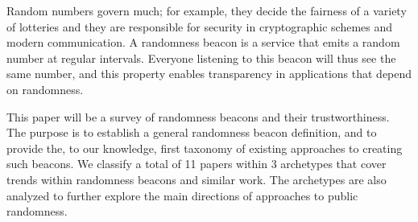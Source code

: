 Random numbers govern much; for example, they decide the fairness of a variety of lotteries and they are responsible for security in cryptographic schemes and modern communication. A randomness beacon is a service that emits a random number at regular intervals. Everyone listening to this beacon will thus see the same number, and this property enables transparency in applications that depend on randomness.%

This paper will be a survey of randomness beacons and their trustworthiness. The purpose is to establish a general randomness beacon definition, and to provide the, to our knowledge, first taxonomy of existing approaches to creating such beacons. We classify a total of 11 papers within 3 archetypes that cover trends within randomness beacons and similar work. The archetypes are also analyzed to further explore the main directions of approaches to public randomness. 